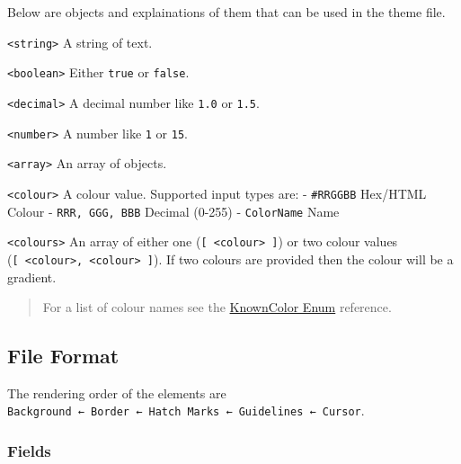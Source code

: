 \documentclass[
]{book}
\begin{document}
Below are objects and explainations of them that can be used in the theme file.

\texttt{\textless{}string\textgreater{}} A string of text.

\texttt{\textless{}boolean\textgreater{}} Either \texttt{true} or \texttt{false}.

\texttt{\textless{}decimal\textgreater{}} A decimal number like \texttt{1.0} or \texttt{1.5}.

\texttt{\textless{}number\textgreater{}} A number like \texttt{1} or \texttt{15}.

\texttt{\textless{}array\textgreater{}} An array of objects.

\texttt{\textless{}colour\textgreater{}} A colour value.
Supported input types are:
- \texttt{\textquotesingle{}\#RRGGBB\textquotesingle{}} Hex/HTML Colour
- \texttt{RRR,\ GGG,\ BBB} Decimal (0-255)
- \texttt{ColorName} Name

\texttt{\textless{}colours\textgreater{}} An array of either one (\texttt{{[}\ \textless{}colour\textgreater{}\ {]}}) or two colour values (\texttt{{[}\ \textless{}colour\textgreater{},\ \textless{}colour\textgreater{}\ {]}}).
If two colours are provided then the colour will be a gradient.

\begin{quote}
For a list of colour names see the \href{https://docs.microsoft.com/en-us/dotnet/api/system.drawing.knowncolor?view=netcore-3.1}{KnownColor Enum} reference.
\end{quote}

\hypertarget{file-format}{%
\subsection{File Format}\label{file-format}}

The rendering order of the elements are \texttt{Background\ ←\ Border\ ←\ Hatch\ Marks\ ←\ Guidelines\ ←\ Cursor}.

\hypertarget{fields}{%
\subsubsection{Fields}\label{fields}}
\end{document}
